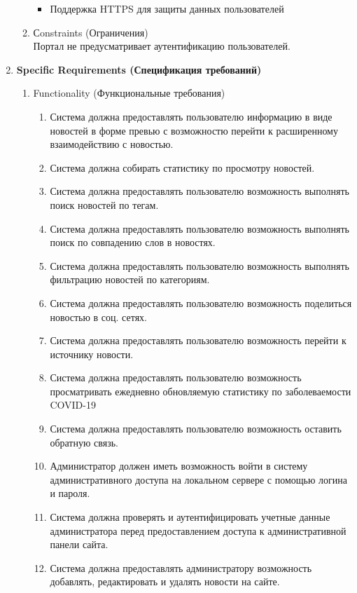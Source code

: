 \begin{enumerate}
\begin{enumerate}[label=2.\arabic*]
\begin{itemize}
            \item Поддержка HTTPS для защиты данных пользователей
        \end{itemize}
        \item Сonstraints (Ограничения) \\
        Портал не предусматривает аутентификацию пользователей.
    \end{enumerate}
    \BgThispage
    \item \textbf{Specific Requirements (Спецификация требований)}
    \begin{enumerate}[label=3.\arabic*]
        \item Functionality (Функциональные требования)
        \begin{enumerate}[label=3.1.\arabic*]
            \item Система должна предоставлять пользователю информацию в виде новостей в форме превью с возможностю перейти к расширенному взаимодействию с новостью.
            \item Система должна собирать статистику по просмотру новостей.
            \item Система должна предоставлять пользователю возможность выполнять поиск новостей по тегам.
            \item Система должна предоставлять пользователю возможность выполнять поиск по совпадению слов в новостях.
            \item Система должна предоставлять пользователю возможность выполнять фильтрацию новостей по категориям.
            \item Система должна предоставлять пользователю возможность поделиться новостью в соц. сетях.
            \item Система должна предоставлять пользователю возможность перейти к источнику новости.
            \item Система должна предоставлять пользователю возможность просматривать ежедневно обновляемую статистику по заболеваемости COVID-19
            \item Система должна предоставлять пользователю возможность оставить обратную связь.
            \item Администратор должен иметь возможность войти в систему административного доступа на локальном сервере с помощью логина и пароля.
            \item Система должна проверять и аутентифицировать учетные данные администратора перед предоставлением доступа к административной панели сайта.
            \item Система должна предоставлять администратору возможность добавлять, редактировать и удалять новости на сайте.

\end{enumerate}
\end{enumerate}
\end{enumerate}
